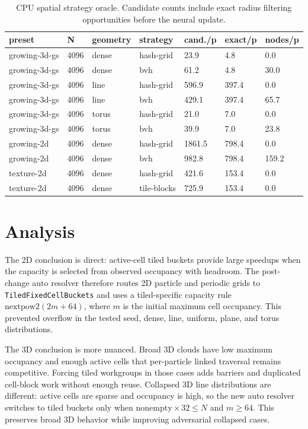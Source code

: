 \documentclass[10pt,twocolumn]{article}
\begin{document}
\begin{table}[t]
\centering
\small
\begin{tabular}{lllllll}
\toprule
preset & N & geometry & strategy & cand./p & exact/p & nodes/p \\
\midrule
growing-3d-gs & 4096 & dense & hash-grid & 23.9 & 4.8 & 0.0 \\
growing-3d-gs & 4096 & dense & bvh & 61.2 & 4.8 & 30.0 \\
growing-3d-gs & 4096 & line & hash-grid & 596.9 & 397.4 & 0.0 \\
growing-3d-gs & 4096 & line & bvh & 429.1 & 397.4 & 65.7 \\
growing-3d-gs & 4096 & torus & hash-grid & 21.0 & 7.0 & 0.0 \\
growing-3d-gs & 4096 & torus & bvh & 39.9 & 7.0 & 23.8 \\
growing-2d & 4096 & dense & hash-grid & 1861.5 & 798.4 & 0.0 \\
growing-2d & 4096 & dense & bvh & 982.8 & 798.4 & 159.2 \\
texture-2d & 4096 & dense & hash-grid & 421.6 & 153.4 & 0.0 \\
texture-2d & 4096 & dense & tile-blocks & 725.9 & 153.4 & 0.0 \\
\bottomrule
\end{tabular}
\caption{CPU spatial strategy oracle. Candidate counts include exact radius filtering opportunities before the neural update.}
\label{tab:spatial}
\end{table}

\section{Analysis}
The 2D conclusion is direct: active-cell tiled buckets provide large speedups
when the capacity is selected from observed occupancy with headroom. The
post-change auto resolver therefore routes 2D particle and periodic grids to
\texttt{TiledFixedCellBuckets} and uses a tiled-specific capacity rule
\(\mathrm{nextpow2}(2m+64)\), where \(m\) is the initial maximum cell
occupancy. This prevented overflow in the tested seed, dense, line, uniform,
plane, and torus distributions.

The 3D conclusion is more nuanced. Broad 3D clouds have low maximum occupancy
and enough active cells that per-particle linked traversal remains competitive.
Forcing tiled workgroups in those cases adds barriers and duplicated
cell-block work without enough reuse. Collapsed 3D line distributions are
different: active cells are sparse and occupancy is high, so the new auto
resolver switches to tiled buckets only when
\(\mathrm{nonempty}\times 32 \leq N\) and \(m \geq 64\). This preserves broad
3D behavior while improving adversarial collapsed cases.
\end{document}
